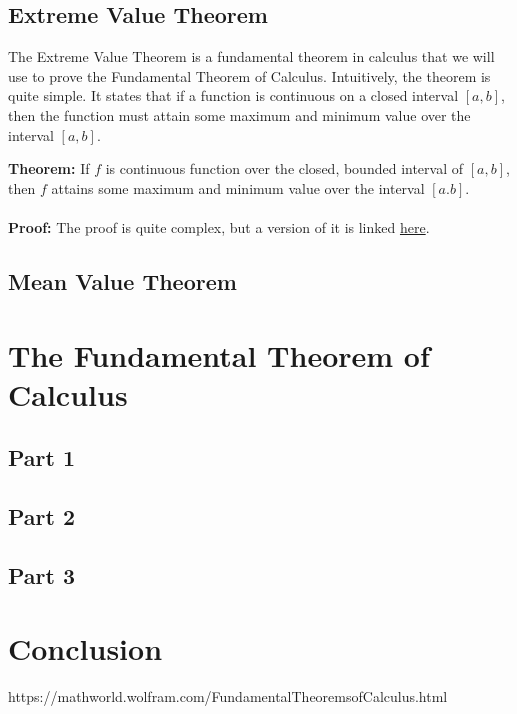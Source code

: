 \documentclass[8pt]{extarticle}
\begin{document}
\subsection{Extreme Value Theorem}
The Extreme Value Theorem is a fundamental theorem in calculus that we will use to prove the Fundamental Theorem of Calculus.
Intuitively, the theorem is quite simple. It states that if a function is continuous on a closed interval $[a,b]$, then the function must attain some maximum and minimum value over the interval $[a,b]$.
\begin{boxedsection}
  \textbf{Theorem:} If $f$ is continuous function over the closed, bounded interval of $[a,b]$, then $f$ attains some maximum and minimum value over the interval $[a.b]$.\\
  \\
  \textbf{Proof:} The proof is quite complex, but a version of it is linked \href{https://mathcenter.oxford.emory.edu/site/math111/proofs/extremeValueTheorem/}{here}.
\end{boxedsection}
\subsection{Mean Value Theorem}

\section{The Fundamental Theorem of Calculus}
\subsection{Part 1}
\subsection{Part 2}
\subsection{Part 3}

\section{Conclusion}



https://mathworld.wolfram.com/FundamentalTheoremsofCalculus.html
\end{document}
